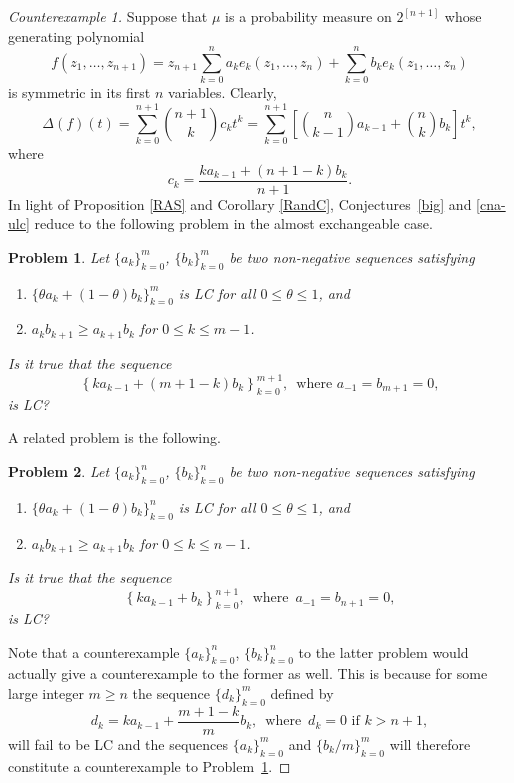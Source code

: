 \documentclass[10pt,reqno]{amsart}
\theoremstyle{plain}
\newtheorem{problem}{Problem}[section]
\theoremstyle{definition}
\theoremstyle{remark}
\newcommand{\De}{\Delta}
\begin{document}
\begin{proof}[Counterexample 1]
Suppose that $\mu$ is a probability measure on $2^{[n+1]}$ whose 
generating polynomial 
$$
f(z_1,\ldots, z_{n+1})= 
z_{n+1}\sum_{k=0}^{n}a_ke_k(z_1,\ldots, z_n)+
\sum_{k=0}^{n}b_ke_k(z_1,\ldots, z_n)
$$
is symmetric in its first $n$ variables. Clearly, 
$$
\De(f)(t)=\sum_{k=0}^{n+1}\binom {n+1} k c_kt^k
=\sum_{k=0}^{n+1}\!\left[\binom n {k-1} a_{k-1}+\binom n k b_k\right]\!t^k, 
$$
where
$$
c_k = \frac{ka_{k-1}+(n+1-k)b_k}{n+1}.
$$
In light of Proposition \ref{RAS} and Corollary \ref{RandC},  
Conjectures~\ref{big} and \ref{cna-ulc} reduce to the following problem in 
the almost exchangeable case.  

\begin{problem}\label{p1}
Let $\{a_k\}_{k=0}^m$, $\{b_k\}_{k=0}^m$ be two non-negative sequences  
satisfying 
\begin{enumerate}
\item $\{\theta a_k+(1-\theta) b_k\}_{k=0}^m$ is LC 
for all $0\leq \theta \leq 1$, and 
\item $a_kb_{k+1} \geq a_{k+1}b_k$ for $0 \leq k \leq m-1$.
\end{enumerate}
Is it true that the sequence 
$$
\left\{ka_{k-1}+(m+1-k)b_k\right\}_{k=0}^{m+1},\,\text{ where }
a_{-1}=b_{m+1}=0, 
$$
is LC? 
\end{problem}

A related problem is the following.

\begin{problem}\label{p2}
Let $\{a_k\}_{k=0}^n$, $\{b_k\}_{k=0}^n$ be two non-negative sequences  
satisfying 
\begin{enumerate}
\item $\{\theta a_k+(1-\theta) b_k\}_{k=0}^n$ is LC 
for all $0\leq \theta \leq 1$, and 
\item $a_kb_{k+1} \geq a_{k+1}b_k$ for $0 \leq k \leq n-1$.
\end{enumerate}
Is it true that the sequence 
$$
\left\{ka_{k-1}+b_k\right\}_{k=0}^{n+1},\,\text{ where }\, a_{-1}=b_{n+1}=0, 
$$
is LC?
\end{problem}

Note that a counterexample $\{a_k\}_{k=0}^n$, $\{b_k\}_{k=0}^n$ to 
the latter problem would actually give a counterexample  to 
the former as well. This is
 because for some large integer $m\geq n$  the sequence $\{d_k\}_{k=0}^m$ 
defined by 
\begin{equation}\label{count-m}
d_k= ka_{k-1}+\frac {m+1-k} m b_k,\,\text{ where }\,     
d_k=0 \mbox{ if } k >n+1,
\end{equation}
will fail to be LC and the sequences  $\{a_k\}_{k=0}^m$ and 
$\{b_k/m\}_{k=0}^m$ 
will therefore constitute a counterexample to Problem~\ref{p1}. 


\end{proof}
\end{document}
